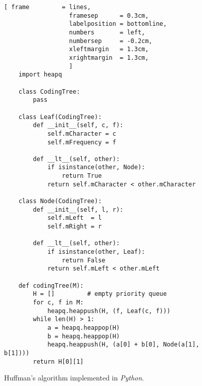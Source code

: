 \begin{figure}[!ht]
\centering
\begin{Verbatim}[ frame         = lines, 
                  framesep      = 0.3cm, 
                  labelposition = bottomline,
                  numbers       = left,
                  numbersep     = -0.2cm,
                  xleftmargin   = 1.3cm,
                  xrightmargin  = 1.3cm,
                  ]
    import heapq
                  
    class CodingTree:
        pass
    
    class Leaf(CodingTree):
        def __init__(self, c, f):
            self.mCharacter = c
            self.mFrequency = f
            
        def __lt__(self, other):
            if isinstance(other, Node):
                return True
            return self.mCharacter < other.mCharacter
                
    class Node(CodingTree):
        def __init__(self, l, r):
            self.mLeft  = l
            self.mRight = r
    
        def __lt__(self, other):
            if isinstance(other, Leaf):
                return False
            return self.mLeft < other.mLeft
                
    def codingTree(M):
        H = []         # empty priority queue
        for c, f in M:
            heapq.heappush(H, (f, Leaf(c, f)))
        while len(H) > 1:
            a = heapq.heappop(H)
            b = heapq.heappop(H)
            heapq.heappush(H, (a[0] + b[0], Node(a[1], b[1])))
        return H[0][1]
\end{Verbatim}
\vspace*{-0.3cm}
\caption{Huffman's algorithm implemented in \textsl{Python}.}
\label{fig:Huffman.ipynb}
\end{figure} 

